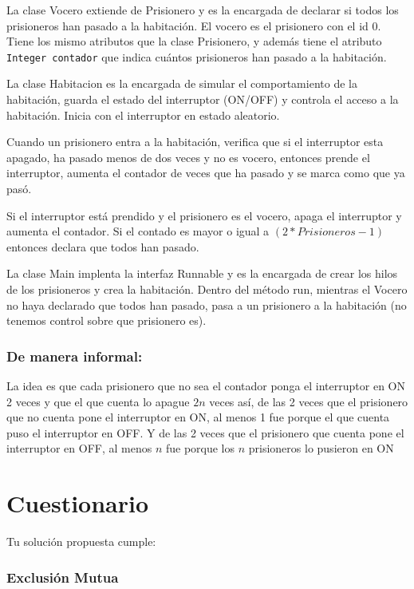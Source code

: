 \documentclass{article}
\begin{document}
La clase Vocero extiende de Prisionero y es la encargada de declarar si todos los prisioneros han pasado a la habitación. El vocero es el prisionero con el id 0. Tiene los mismo atributos que la clase Prisionero, y además tiene el atributo \texttt{Integer contador} que indica cuántos prisioneros han pasado a la habitación.

La clase Habitacion es la encargada de simular el comportamiento de la habitación, guarda el estado del interruptor (ON/OFF) y controla el acceso a la habitación.
Inicia con el interruptor en estado aleatorio.

Cuando un prisionero entra a la habitación, verifica que si el interruptor esta apagado, ha pasado menos de dos veces y no es vocero, entonces prende el interruptor, aumenta el contador de veces que ha pasado y se marca como que ya pasó.

Si el interruptor está prendido y el prisionero es el vocero, apaga el interruptor y aumenta el contador. Si el contado es mayor o igual a $(2*Prisioneros-1)$ entonces declara que todos han pasado.

La clase Main implenta la interfaz Runnable y es la encargada de crear los hilos de los prisioneros y crea la habitación.
Dentro del método run, mientras el Vocero no haya declarado que todos han pasado, pasa a un prisionero a la habitación (no tenemos control sobre que prisionero es).

\subsubsection*{De manera informal:}
La idea es que  cada prisionero que no sea el contador ponga el interruptor en ON 2 veces y que el que cuenta lo apague $2n$ veces así, de las 2 veces que el prisionero que no cuenta pone el interruptor en ON,  al menos 1 fue porque el que cuenta puso el interruptor en OFF. Y de las 2 veces que el prisionero que cuenta pone el interruptor en OFF,  al menos $n$ fue porque los $n$ prisioneros lo pusieron en ON

\section{Cuestionario}

Tu solución propuesta cumple:
\subsubsection*{Exclusión Mutua}
\end{document}
